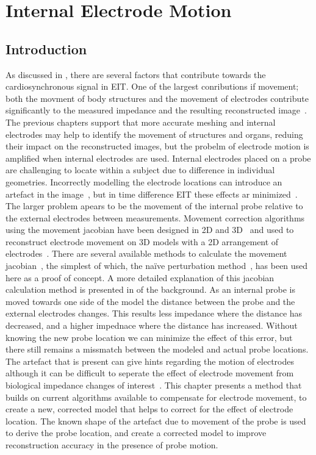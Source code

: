 \chapter{Internal Electrode Motion}
\label{chap:chapter-7}
\section{Introduction}
As discussed in , there are several factors that contribute towards
the cardiosynchronous signal in EIT. One of the largest conributions 
if movement; both the movment of 
body structures and the movement of electrodes contribute significantly to the measured
impedance and the resulting reconstructed 
image~\parencite{adler_origins_2017,proenca_influence_2015}.
The previous chapters support that more accurate meshing and internal electrodes may
help to identify the movement of structures and organs, reduing their impact on the 
reconstructed images, but the probelm of electrode motion is amplified when internal
electrodes are used. 
Internal electrodes placed on a probe are challenging to locate within a subject
due to difference in individual geometries. Incorrectly modelling the electrode 
locations can introduce an artefact in the image~\parencite{boyle_impact_2011}, 
but in time difference EIT these effects ar minimized~\parencite{adler_electrical_2017}. 
The larger problem apears 
to be the 
movement of the internal probe relative to the external electrodes between
measurements. 
Movement correction algorithms using the movement jacobian have been 
designed in 2D 
and 3D~\parencite{gomez-laberge_direct_2007,soleimani_imaging_2006,gomez-laberge_direct_2008}
and used to reconstruct electrode movement on 3D models with a 2D arrangement 
of electrodes~\parencite{boyle_geophysical_2016}. 
There are several available methods to calculate the movement 
jacobian~\parencite{boyle_methods_2017}, the simplest of which,
the na\"{i}ve perturbation method~\parencite{gomez-laberge_direct_2008},
has been used here as a proof of concept.  
A more detailed explanation of this jacobian calculation method is presented in 
 of the background.
As an internal probe is moved towards one side of the model the distance between the 
probe and the external electrodes changes. This results less impedance where the distance 
has decreased, and a higher impednace where the distance has increased. Without knowing 
the new probe location we can minimize the effect of this error, but there still remains 
a missmatch between the modeled and actual probe locations. 
The artefact that is present can give hints regarding the motion of electrodes
although it can be difficult to seperate the effect of electrode movement 
from biological impedance changes of interest~\parencite{boyle_geophysical_2016}. 
This chapter presents a method that builds on current algorithms 
available to compensate for electrode movement, to create a new, corrected model
that helps to correct for the effect of electrode location.  
The known shape of the artefact due to movement of the probe is used to 
derive the probe location, and create a corrected model to improve 
reconstruction accuracy in the presence of probe motion.

